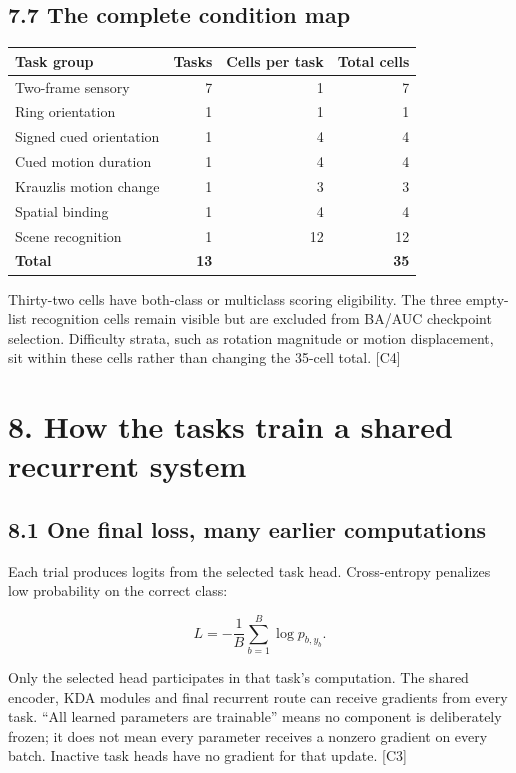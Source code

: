 \documentclass[
  11pt,
]{article}
\newcounter{none} %
\let\oldsubsection\subsection
\renewcommand{\subsection}{\Needspace{6\baselineskip}\oldsubsection}
\begin{document}
\subsection{7.7 The complete condition
map}\label{the-complete-condition-map}

{\def\LTcaptype{none} %
\begin{longtable}[]{@{}lrrr@{}}
\toprule\noalign{}
Task group & Tasks & Cells per task & Total cells \\
\midrule\noalign{}
\endhead
\bottomrule\noalign{}
\endlastfoot
Two-frame sensory & 7 & 1 & 7 \\
Ring orientation & 1 & 1 & 1 \\
Signed cued orientation & 1 & 4 & 4 \\
Cued motion duration & 1 & 4 & 4 \\
Krauzlis motion change & 1 & 3 & 3 \\
Spatial binding & 1 & 4 & 4 \\
Scene recognition & 1 & 12 & 12 \\
\textbf{Total} & \textbf{13} & & \textbf{35} \\
\end{longtable}
}

Thirty-two cells have both-class or multiclass scoring eligibility. The
three empty-list recognition cells remain visible but are excluded from
BA/AUC checkpoint selection. Difficulty strata, such as rotation
magnitude or motion displacement, sit within these cells rather than
changing the 35-cell total. {[}C4{]}

\newpage

\section{8. How the tasks train a shared recurrent
system}\label{how-the-tasks-train-a-shared-recurrent-system}

\subsection{8.1 One final loss, many earlier
computations}\label{one-final-loss-many-earlier-computations}

Each trial produces logits from the selected task head. Cross-entropy
penalizes low probability on the correct class:

\[L=-\frac1B\sum_{b=1}^{B}\log p_{b,y_b}.\]

Only the selected head participates in that task's computation. The
shared encoder, KDA modules and final recurrent route can receive
gradients from every task. ``All learned parameters are trainable''
means no component is deliberately frozen; it does not mean every
parameter receives a nonzero gradient on every batch. Inactive task
heads have no gradient for that update. {[}C3{]}
\end{document}
